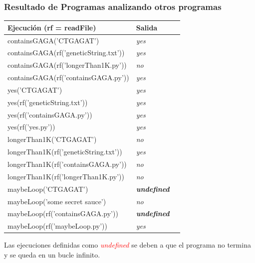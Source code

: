 \documentclass[xcolor=table]{beamer}
\begin{document}
\begin{frame}  \frametitle{Resultado de Programas analizando otros programas} \tiny  

\begin{table}[]
\begin{tabular}{|l|l|l|}
\hline
\rowcolor[HTML]{EFEFEF} 
{\color[HTML]{000000} \textbf{Ejecución (rf = readFile)}}  & {\color[HTML]{000000} \textbf{Salida}}             \\ \hline\hline
containsGAGA('CTGAGAT')                                   & \textit{yes}   \\ \hline
containsGAGA(rf('geneticString.txt'))                     & \textit{yes}   \\ \hline
containsGAGA(rf('longerThan1K.py'))                       & \textit{no}  \\ \hline
containsGAGA(rf('containsGAGA.py'))                       & \textit{yes}    \\ \hline\hline
yes('CTGAGAT')                                            & \textit{yes}     \\ \hline
yes(rf('geneticString.txt'))                              & \textit{yes}    \\ \hline
yes(rf('containsGAGA.py'))                                & \textit{yes}   \\ \hline
yes(rf('yes.py'))                                         & \textit{yes}    \\ \hline\hline
longerThan1K('CTGAGAT')                                   & \textit{no}     \\ \hline
longerThan1K(rf('geneticString.txt'))                     & \textit{yes}     \\ \hline
longerThan1K(rf('containsGAGA.py'))                       & \textit{no}    \\ \hline
longerThan1K(rf('longerThan1K.py'))                       & \textit{no}    \\ \hline\hline
maybeLoop('CTGAGAT')            &{\color[HTML]{FE0000} \textit{\textbf{undefined}}} \\ \hline
maybeLoop('some secret sauce')                            & \textit{no}    \\ \hline
maybeLoop(rf('containsGAGA.py')) &{\color[HTML]{FE0000} \textit{\textbf{undefined}}} \\ \hline
maybeLoop(rf('maybeLoop.py'))              & \textit{yes}    \\ \hline
\end{tabular}
\end{table}
Las ejecuciones definidas como \textcolor{red}{\textit{undefined}} se deben a que el programa no termina y se queda en un bucle infinito.

\end{frame} 
\end{document}
